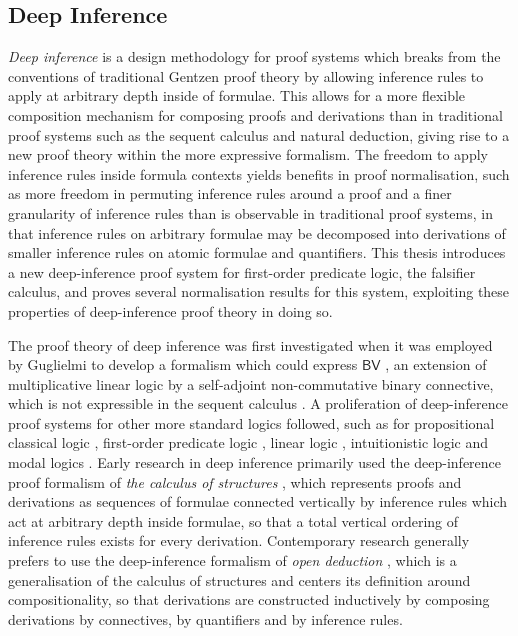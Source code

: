 \documentclass[10pt]{article}
\theoremstyle{definition}\newtheorem{remark}[theorem]{Remark}
\theoremstyle{definition}\newtheorem{example}[theorem]{Example}
\theoremstyle{definition}\newtheorem{definition}[theorem]{Definition}
\begin{document}
	\subsection{Deep Inference}\label{DeepInferenceSection}
	
	\textit{Deep inference} is a design methodology for proof systems which breaks from the conventions of traditional Gentzen proof theory by allowing inference rules to apply at arbitrary depth inside of formulae. This allows for a more flexible composition mechanism for composing proofs and derivations than in traditional proof systems such as the sequent calculus and natural deduction, giving rise to a new proof theory within the more expressive formalism. The freedom to apply inference rules inside formula contexts yields benefits in proof normalisation, such as more freedom in permuting inference rules around a proof and a finer granularity of inference rules than is observable in traditional proof systems, in that inference rules on arbitrary formulae may be decomposed into derivations of smaller inference rules on atomic formulae and quantifiers. This thesis introduces a new deep-inference proof system for first-order predicate logic, the falsifier calculus, and proves several normalisation results for this system, exploiting these properties of deep-inference proof theory in doing so.
	
	The proof theory of deep inference was first investigated when it was employed by Guglielmi to develop a formalism which could express $\mathsf{BV}$ \cite{AlessioSystemOfInteractionAndStructure}, an extension of multiplicative linear logic by a self-adjoint non-commutative binary connective, which is not expressible in the sequent calculus \cite{TiuNeedForDeepInference}. A proliferation of deep-inference proof systems for other more standard logics followed, such as for propositional classical logic \cite{BrunnlerTiuLocalClassical}, first-order predicate logic \cite{BrunnlerGuglielmiFiniteChoice}, linear logic \cite{StrassburgerLocalLinear}, intuitionistic logic \cite{TiuLocalIntuitionistic} and modal logics \cite{StewartStouppaModalLogics}. Early research in deep inference primarily used the deep-inference proof formalism of \textit{the calculus of structures} \cite{AlessioSystemOfInteractionAndStructure}, which represents proofs and derivations as sequences of formulae connected vertically by inference rules which act at arbitrary depth inside formulae, so that a total vertical ordering of inference rules exists for every derivation. Contemporary research generally prefers to use the deep-inference formalism of \textit{open deduction} \cite{GuglielmiGundersenParigotOpenDeduction}, which is a generalisation of the calculus of structures and centers its definition around compositionality, so that derivations are constructed inductively by composing derivations by connectives, by quantifiers and by inference rules.
	
\end{document}
